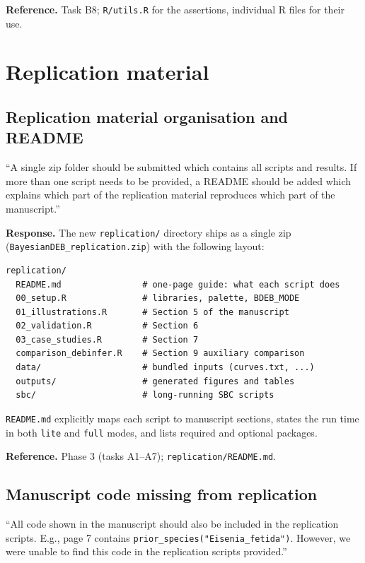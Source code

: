 \documentclass[11pt,a4paper]{article}
\newcommand{\code}[1]{\texttt{#1}}
\begin{document}
\textbf{Reference.} Task B8; \code{R/utils.R} for the assertions,
individual R files for their use.

\section{Replication material}

\subsection{Replication material organisation and README}

\begin{displayquote}
``A single zip folder should be submitted which contains all
scripts and results. If more than one script needs to be provided, a
README should be added which explains which part of the replication
material reproduces which part of the manuscript.''
\end{displayquote}

\textbf{Response.} The new \code{replication/} directory ships as a
single zip (\code{BayesianDEB\_replication.zip}) with the following
layout:

\begin{Verbatim}[fontsize=\small]
replication/
  README.md                # one-page guide: what each script does
  00_setup.R               # libraries, palette, BDEB_MODE
  01_illustrations.R       # Section 5 of the manuscript
  02_validation.R          # Section 6
  03_case_studies.R        # Section 7
  comparison_debinfer.R    # Section 9 auxiliary comparison
  data/                    # bundled inputs (curves.txt, ...)
  outputs/                 # generated figures and tables
  sbc/                     # long-running SBC scripts
\end{Verbatim}

\code{README.md} explicitly maps each script to manuscript sections,
states the run time in both \code{lite} and \code{full} modes, and
lists required and optional packages.

\textbf{Reference.} Phase 3 (tasks A1--A7); \code{replication/README.md}.

\subsection{Manuscript code missing from replication}

\begin{displayquote}
``All code shown in the manuscript should also be included in
the replication scripts. E.g., page 7 contains
\verb|prior_species("Eisenia_fetida")|. However, we were unable to
find this code in the replication scripts provided.''
\end{displayquote}
\end{document}
